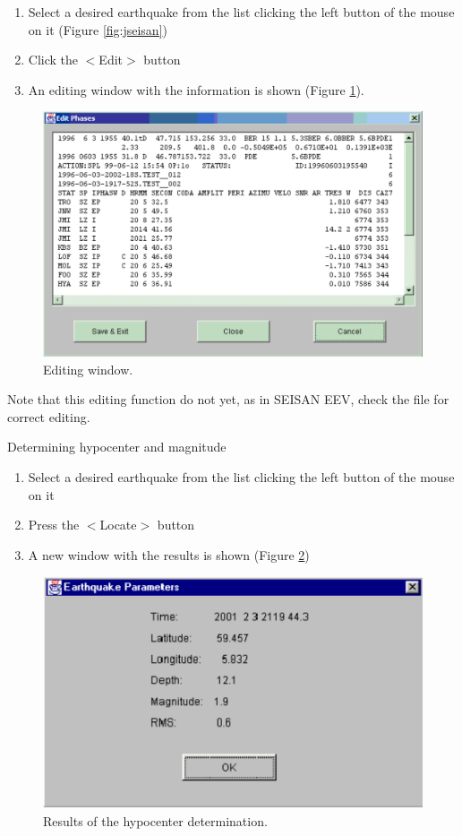 \begin{enumerate}
\item
 Select a desired earthquake from the list clicking the left button of the 
mouse on it (Figure \ref{fig:jseisan})
\item
 Click the $<$Edit$>$ button 
\item
 An editing window with the information is shown (Figure \ref{fig:editing-window}).
\end{enumerate}

\begin{figure}
\centerline{\includegraphics[width=0.9\linewidth]{fig/fig12}}
\caption{Editing window.}
\label{fig:editing-window}
\end{figure}

Note that this editing function do not yet, as in SEISAN EEV, check the file for correct editing. 

Determining hypocenter and magnitude \newline
\begin{enumerate}
\item
 Select a desired earthquake from the list clicking the left button of the mouse on it 
\item
 Press the $<$Locate$>$ button 
\item
 A new window with the results is shown (Figure \ref{fig:hypocenter-determination}) 
\end{enumerate}

\begin{figure}
\centerline{\includegraphics[width=0.9\linewidth]{fig/fig13}}
\caption{Results of the hypocenter determination.}
\label{fig:hypocenter-determination}
\end{figure}

